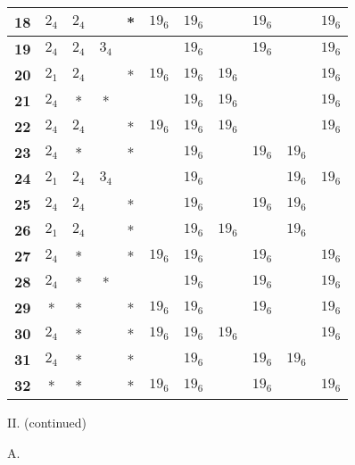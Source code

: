\documentclass[oneside]{article}
\begin{document}
\begin{center}
\begin{tabular}{|r|c|c|c|c|c|c|c|c|c|c|}
\textbf{18}&$2_4$   &$2_4$   &        &*&$19_6$&$19_6$&      &$19_6$&      &$19_6$ \\ \hline
\textbf{19}&$2_4$   &$2_4$   &$3_4$   & &      &$19_6$&      &$19_6$&      &$19_6$ \\ \hline
\textbf{20}&$2_1$   &$2_4$   &        &*&$19_6$&$19_6$&$19_6$&      &      &$19_6$ \\ \hline
\textbf{21}&$2_4$   &*       &*       & &      &$19_6$&$19_6$&      &      &$19_6$ \\ \hline
\textbf{22}&$2_4$   &$2_4$   &        &*&$19_6$&$19_6$&$19_6$&      &      &$19_6$ \\ \hline
\textbf{23}&$2_4$   &*       &        &*&      &$19_6$&      &$19_6$&$19_6$&       \\ \hline
\textbf{24}&$2_1$   &$2_4$   &$3_4$   & &      &$19_6$&      &      &$19_6$&$19_6$ \\ \hline
\textbf{25}&$2_4$   &$2_4$   &        &*&      &$19_6$&      &$19_6$&$19_6$&       \\ \hline
\textbf{26}&$2_1$   &$2_4$   &        &*&      &$19_6$&$19_6$&      &$19_6$&       \\ \hline
\textbf{27}&$2_4$   &*       &        &*&$19_6$&$19_6$&      &$19_6$&      &$19_6$ \\ \hline
\textbf{28}&$2_4$   &*       &*       & &      &$19_6$&      &$19_6$&      &$19_6$ \\ \hline
\textbf{29}&*       &*       &        &*&$19_6$&$19_6$&      &$19_6$&      &$19_6$ \\ \hline
\textbf{30}&$2_4$   &*       &        &*&$19_6$&$19_6$&$19_6$&      &      &$19_6$ \\ \hline
\textbf{31}&$2_4$   &*       &        &*&      &$19_6$&      &$19_6$&$19_6$&       \\ \hline
\textbf{32}&*       &*       &        &*&$19_6$&$19_6$&      &$19_6$&      &$19_6$ \\ \hline
\end{tabular}

\newpage
\large II. \normalsize (continued)

\smallskip
A.


\end{center}
\end{document}
